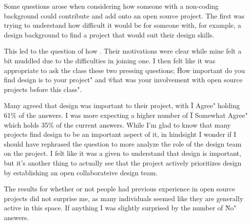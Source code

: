 
Some questions arose when considering how someone with a non-coding background could contribute and add onto an open source project. The first was trying to understand how difficult it would be for someone with, for example, a design background to find a project that would suit their design skills. 

This led to the question of how . Their motivations were clear while mine felt a bit muddled due to the difficulties in joining one. I then felt like it was appropriate to ask the class these two pressing questions; \"How important do you find design is to your project" and \"what was your involvement with open source projects before this class".

Many agreed that design was important to their project, with \"I Agree" holding 61\% of the answers. I was more expecting a higher number of \"I Somewhat Agree" which holds 35\% of the current answers. While I'm glad to know that many projects find design to be an important aspect of it, in hindsight I wonder if I should have rephrased the question to more analyze the role of the design team on the project. I felt like it was a given to understand that design is important, but it's another thing to actually see that the project actively prioritizes design by establishing an open collaborateive design team. 

The results for whether or not people had previous experience in open source projects did not surprise me, as many individuals seemed like they are generally active in this space. If anything I was slightly surprised by the number of \"No" answers.

